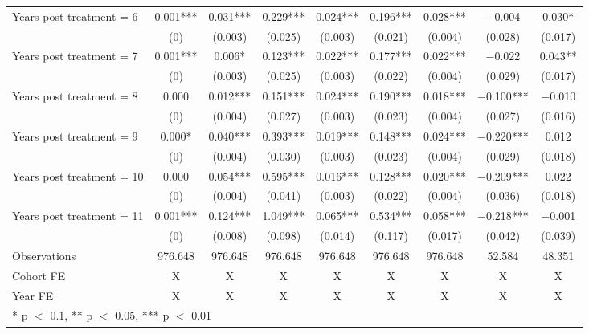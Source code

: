 \begin{table}[H]
{\begin{threeparttable}
\begin{tabular}[t]{lcccccccc}
Years post treatment = 6 & \num{0.001}*** & \num{0.031}*** & \num{0.229}*** & \num{0.024}*** & \num{0.196}*** & \num{ 0.028}*** & \num{-0.004} & \num{ 0.030}*\\
 & (\num{0}) & (\num{0.003}) & (\num{0.025}) & (\num{0.003}) & (\num{0.021}) & (\num{0.004}) & (\num{0.028}) & (\num{0.017})\\
Years post treatment = 7 & \num{0.001}*** & \num{0.006}* & \num{0.123}*** & \num{0.022}*** & \num{0.177}*** & \num{ 0.022}*** & \num{-0.022} & \num{ 0.043}**\\
 & (\num{0}) & (\num{0.003}) & (\num{0.025}) & (\num{0.003}) & (\num{0.022}) & (\num{0.004}) & (\num{0.029}) & (\num{0.017})\\
Years post treatment = 8 & \num{0.000} & \num{0.012}*** & \num{0.151}*** & \num{0.024}*** & \num{0.190}*** & \num{ 0.018}*** & \num{-0.100}*** & \num{-0.010}\\
 & (\num{0}) & (\num{0.004}) & (\num{0.027}) & (\num{0.003}) & (\num{0.023}) & (\num{0.004}) & (\num{0.027}) & (\num{0.016})\\
Years post treatment = 9 & \num{0.000}* & \num{0.040}*** & \num{0.393}*** & \num{0.019}*** & \num{0.148}*** & \num{ 0.024}*** & \num{-0.220}*** & \num{ 0.012}\\
 & (\num{0}) & (\num{0.004}) & (\num{0.030}) & (\num{0.003}) & (\num{0.023}) & (\num{0.004}) & (\num{0.029}) & (\num{0.018})\\
Years post treatment = 10 & \num{0.000} & \num{0.054}*** & \num{0.595}*** & \num{0.016}*** & \num{0.128}*** & \num{ 0.020}*** & \num{-0.209}*** & \num{ 0.022}\\
 & (\num{0}) & (\num{0.004}) & (\num{0.041}) & (\num{0.003}) & (\num{0.022}) & (\num{0.004}) & (\num{0.036}) & (\num{0.018})\\
Years post treatment = 11 & \num{0.001}*** & \num{0.124}*** & \num{1.049}*** & \num{0.065}*** & \num{0.534}*** & \num{ 0.058}*** & \num{-0.218}*** & \num{-0.001}\\
 & (\num{0}) & (\num{0.008}) & (\num{0.098}) & (\num{0.014}) & (\num{0.117}) & (\num{0.017}) & (\num{0.042}) & (\num{0.039})\\
\midrule
Observations & \num{976,648} & \num{976,648} & \num{976,648} & \num{976,648} & \num{976,648} & \num{976,648} & \num{52,584} & \num{48,351}\\
Cohort FE & X & X & X & X & X & X & X & X\\
Year FE & X & X & X & X & X & X & X & X\\
\bottomrule
\multicolumn{9}{l}{\rule{0pt}{1em}* p $<$ 0.1, ** p $<$ 0.05, *** p $<$ 0.01}\\

\end{tabular}
\end{threeparttable}}
\end{table}
